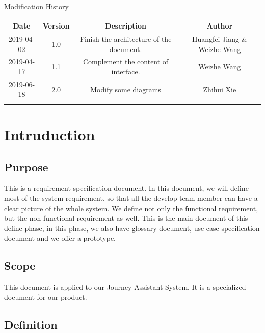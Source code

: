 \documentclass[10pt]{article}
\begin{document}
\newpage

\begin{center}
    {\LARGE Modification History}
    
    \begin{tabular}{|c|c|c|c|} 
        \hline 
        Date&Version&Description&Author\\
        \hline  
        2019-04-02&1.0&Finish the architecture of the document.&Huangfei Jiang \& Weizhe Wang\\
		\hline 
		2019-04-17&1.1&Complement the content of interface.&Weizhe Wang\\
		\hline
		2019-06-18&2.0&Modify some diagrams&Zhihui Xie\\
		\hline
		& & & \\
		\hline
    \end{tabular}    
\end{center}

\newpage

\tableofcontents
\newpage

\section{Intruduction}
\subsection{Purpose}
This is a requirement specification document. In this document, we will define most of the system requirement, so that all the develop team member can have a clear picture of the whole system. We define not only the functional requirement, but the non-functional requirement as well. This is the main document of this define phase, in this phase, we also have glossary document, use case specification document and we offer a prototype.

\subsection{Scope}
This document is applied to our Journey Assistant System. It is a specialized document for our product.

\subsection{Definition}
\end{document}
